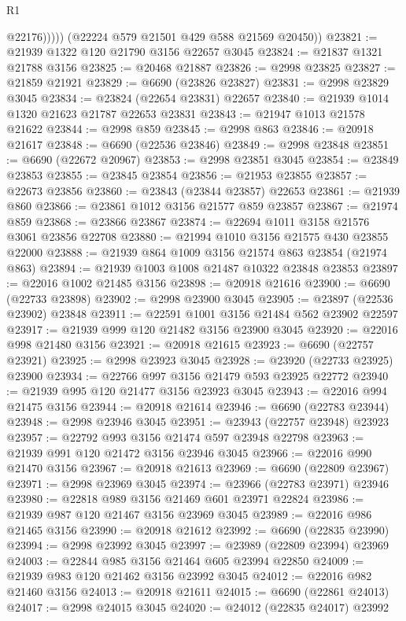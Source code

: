 \begin{lexlean}{R1}
\begin{coremodule}
                @22176)))))
      (@22224 @579 @21501 @429 @588 @21569 @20450))
@23821 := @21939 @1322 @120 @21790 @3156 @22657 @3045
@23824 := @21837 @1321 @21788 @3156
@23825 := @20468 @21887
@23826 := @2998 @23825
@23827 := @21859 @21921
@23829 := @6690 (@23826 @23827)
@23831 := @2998 @23829 @3045
@23834 := @23824 (@22654 @23831) @22657
@23840 := @21939 @1014 @1320 @21623 @21787 @22653 @23831
@23843 := @21947 @1013 @21578 @21622
@23844 := @2998 @859
@23845 := @2998 @863
@23846 := @20918 @21617
@23848 := @6690 (@22536 @23846)
@23849 := @2998 @23848
@23851 := @6690 (@22672 @20967)
@23853 := @2998 @23851 @3045
@23854 := @23849 @23853
@23855 := @23845 @23854
@23856 := @21953 @23855
@23857 := @22673 @23856
@23860 := @23843 (@23844 @23857) @22653
@23861 := @21939 @860
@23866 := @23861 @1012 @3156 @21577 @859 @23857
@23867 := @21974 @859
@23868 := @23866 @23867
@23874 := @22694 @1011 @3158 @21576 @3061 @23856 @22708
@23880 := @21994 @1010 @3156 @21575 @430 @23855 @22000
@23888 := @21939 @864 @1009 @3156 @21574 @863 @23854 (@21974 @863)
@23894 := @21939 @1003 @1008 @21487 @10322 @23848 @23853
@23897 := @22016 @1002 @21485 @3156
@23898 := @20918 @21616
@23900 := @6690 (@22733 @23898)
@23902 := @2998 @23900 @3045
@23905 := @23897 (@22536 @23902) @23848
@23911 := @22591 @1001 @3156 @21484 @562 @23902 @22597
@23917 := @21939 @999 @120 @21482 @3156 @23900 @3045
@23920 := @22016 @998 @21480 @3156
@23921 := @20918 @21615
@23923 := @6690 (@22757 @23921)
@23925 := @2998 @23923 @3045
@23928 := @23920 (@22733 @23925) @23900
@23934 := @22766 @997 @3156 @21479 @593 @23925 @22772
@23940 := @21939 @995 @120 @21477 @3156 @23923 @3045
@23943 := @22016 @994 @21475 @3156
@23944 := @20918 @21614
@23946 := @6690 (@22783 @23944)
@23948 := @2998 @23946 @3045
@23951 := @23943 (@22757 @23948) @23923
@23957 := @22792 @993 @3156 @21474 @597 @23948 @22798
@23963 := @21939 @991 @120 @21472 @3156 @23946 @3045
@23966 := @22016 @990 @21470 @3156
@23967 := @20918 @21613
@23969 := @6690 (@22809 @23967)
@23971 := @2998 @23969 @3045
@23974 := @23966 (@22783 @23971) @23946
@23980 := @22818 @989 @3156 @21469 @601 @23971 @22824
@23986 := @21939 @987 @120 @21467 @3156 @23969 @3045
@23989 := @22016 @986 @21465 @3156
@23990 := @20918 @21612
@23992 := @6690 (@22835 @23990)
@23994 := @2998 @23992 @3045
@23997 := @23989 (@22809 @23994) @23969
@24003 := @22844 @985 @3156 @21464 @605 @23994 @22850
@24009 := @21939 @983 @120 @21462 @3156 @23992 @3045
@24012 := @22016 @982 @21460 @3156
@24013 := @20918 @21611
@24015 := @6690 (@22861 @24013)
@24017 := @2998 @24015 @3045
@24020 := @24012 (@22835 @24017) @23992

\end{coremodule}
\end{lexlean}
